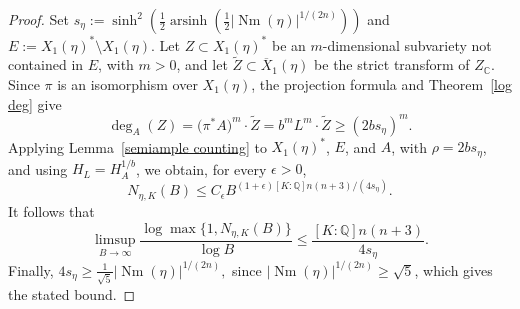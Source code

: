 \documentclass[10pt,a4paper]{amsart}
\newcommand{\Nm}{\operatorname{Nm}}
\begin{document}
\begin{proof}
Set
\(
s_\eta
:=
\sinh^2\left(
\frac12\operatorname{arsinh}
\left(\frac12|\Nm(\eta)|^{1/(2n)}\right)
\right)\)
and
\( E:=X_1(\eta)^*\setminus X_1(\eta).
\)
Let \(Z\subset X_1(\eta)^*\) be an \(m\)-dimensional subvariety not contained in \(E\), with \(m>0\), and let \(\widetilde Z\subset\overline X_1(\eta)\) be the strict transform of \(Z_{\mathbb C}\). Since \(\pi\) is an isomorphism over \(X_1(\eta)\), the projection formula and Theorem~\ref{log deg} give
\[
\deg_A(Z)
=
\bigl(\pi^*A\bigr)^m\cdot\widetilde Z
=
b^mL^m\cdot\widetilde Z
\geq
(2bs_\eta)^m.
\]
 Applying Lemma~\ref{semiample counting} to \(X_1(\eta)^*\), \(E\), and \(A\), with \(\rho=2bs_\eta\), and using \(H_L=H_A^{1/b}\), we obtain, for every \(\epsilon>0\),
\[
N_{\eta,K}(B)
\leq
C_\epsilon B^{(1+\epsilon)[K:\mathbb Q]n(n+3)/(4s_\eta)}.
\]
It follows that
\[
\limsup_{B\to\infty}
\frac{\log\max\{1,N_{\eta,K}(B)\}}{\log B}
\leq
\frac{[K:\mathbb Q]n(n+3)}{4s_\eta}.
\]
Finally,
\(
4s_\eta
\geq
\frac{1}{\sqrt5}|\Nm(\eta)|^{1/(2n)},
\)
since \(|\Nm(\eta)|^{1/(2n)}\geq\sqrt5\), which gives the stated bound.
\end{proof}
\end{document}
